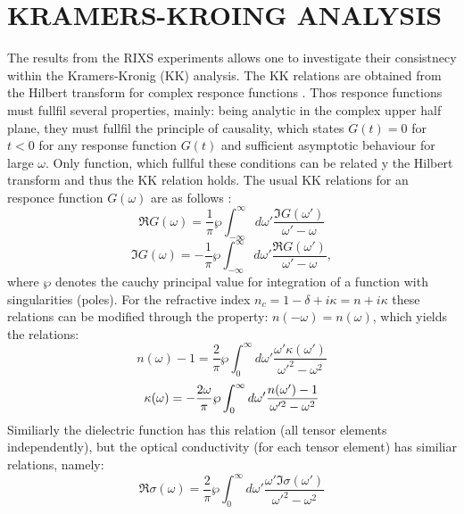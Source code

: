 \documentclass[twocolumn,amsmath,superscriptaddress,amssymb]{revtex4-1}
\begin{document}
\section{KRAMERS-KROING ANALYSIS}
The results from the RIXS experiments allows one to investigate their consistnecy within the Kramers-Kronig (KK) analysis. The KK relations are obtained from the Hilbert transform for complex responce functions \cite{Lucarini}. Thos responce functions must fullfil several properties, mainly: being analytic in the complex upper half plane, they must fullfil the principle of causality, which states $G(t)=0$ for $t<0$ for any response function $G(t)$ and sufficient asymptotic behaviour for large $\omega$. Only function, which fullful these conditions can be related y the Hilbert transform and thus the KK relation holds. The usual KK relations for an responce function $G(\omega )$ are as follows \cite{Lucarini}:
	\begin{equation} %
	\Re G(\omega)=\frac{1}{\pi}\wp\int_{-\infty}^{\infty}d\omega'\frac{\Im G(\omega')}{\omega'-\omega}
	\end{equation}
	\begin{equation}
	\Im G(\omega)=-\frac{1}{\pi}\wp\int_{-\infty}^{\infty}d\omega'\frac{\Re G(\omega')}{\omega'-\omega},
	\end{equation}
\noindent where $\wp$ denotes the cauchy principal value for integration of a function with singularities (poles). For the refractive index $n_c=1-\delta+i\kappa=n+i\kappa$ these relations can be modified through the property: $n(-\omega)=n(\omega)$, which yields the relations:
	\begin{equation}%
	n(\omega)-1=\frac{2}{\pi}\wp\int_{0}^{\infty}d\omega'\frac{\omega' \kappa(\omega')}{\omega'^2-\omega^2}
	\end{equation}
	\begin{equation}
	\kappa(\omega)=-\frac{2\omega}{\pi}\wp\int_{0}^{\infty}d\omega'\frac{ n(\omega')-1}{\omega'^2-\omega^2}\\ \\
	\end{equation}
Similiarly the dielectric function has this relation (all tensor elements independently), but the optical conductivity (for each tensor element) has similiar relations, namely:
	\begin{equation}%
		\Re\sigma(\omega)=\frac{2}{\pi}\wp\int_{0}^{\infty}d\omega'\frac{\omega' \Im\sigma(\omega')}{\omega'^2-\omega^2}
	\end{equation}
\end{document}
